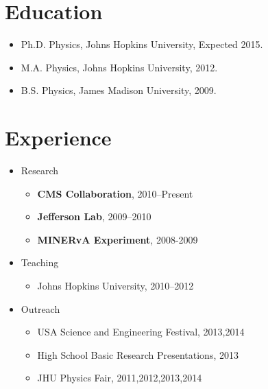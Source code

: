\documentclass[12pt,oneside,final]{thesis}
\begin{document}
\begin{vita}



\section*{Education}

\begin{itemize}
  \item Ph.D. Physics, Johns Hopkins University, Expected 2015.
  \item M.A. Physics, Johns Hopkins University, 2012.
  \item B.S. Physics, James Madison University, 2009.
\end{itemize}


\section*{Experience}

\begin{itemize}
\item Research
\begin{itemize}
\item \textbf{CMS Collaboration}, 2010--Present
\item \textbf{Jefferson Lab}, 2009--2010
\item \textbf{MINERvA Experiment}, 2008-2009
\end{itemize}
\item Teaching
\begin{itemize}
\item Johns Hopkins University, 2010--2012
\end{itemize}
\item Outreach
\begin{itemize}
\item USA Science and Engineering Festival, 2013,2014
\item High School Basic Research Presentations, 2013
\item JHU Physics Fair, 2011,2012,2013,2014
\end{itemize}
\end{itemize}


\end{vita}
\end{document}
